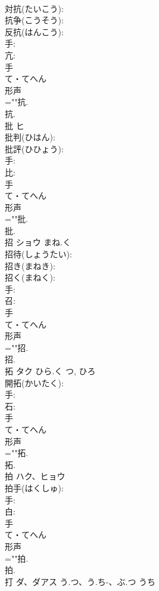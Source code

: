 \documentclass[8pt]{extreport}
\begin{document}
\begin{CJK}{UTF8}{min}
\\	対抗(たいこう): 
\\	抗争(こうそう): 
\\	反抗(はんこう): 
\\	手: 
\\	亢: 
\\	手	
\\	て・てへん	
\\	形声 
\\	=""抗.
\\	抗.
\\	批	ヒ			
\\	批判(ひはん): 
\\	批評(ひひょう): 
\\	手: 
\\	比: 
\\	手	
\\	て・てへん	
\\	形声 
\\	=""批.
\\	批.
\\	招	ショウ	まね.く		
\\	招待(しょうたい): 
\\	招き(まねき): 
\\	招く(まねく): 
\\	手: 
\\	召: 
\\	手	
\\	て・てへん	
\\	形声 
\\	=""招.
\\	招.
\\	拓	タク	ひら.く	つ, ひろ	
\\	開拓(かいたく): 
\\	手: 
\\	石: 
\\	手	
\\	て・てへん	
\\	形声 
\\	=""拓.
\\	拓.
\\	拍	ハク、ヒョウ			
\\	拍手(はくしゅ): 
\\	手: 
\\	白: 
\\	手	
\\	て・てへん	
\\	形声 
\\	=""拍.
\\	拍.
\\	打	ダ、ダアス	う.つ、う.ち-、ぶ.つ	うち	

\end{CJK}
\end{document}
